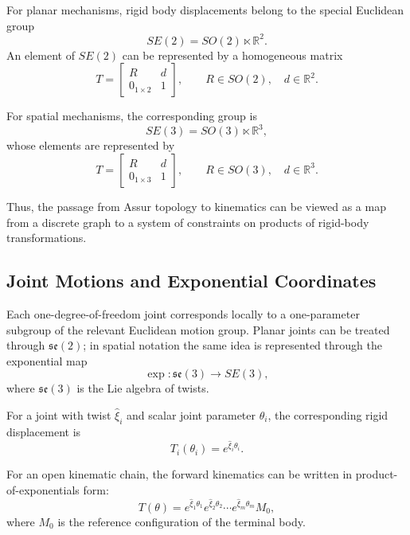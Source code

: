 For planar mechanisms, rigid body displacements belong to the special Euclidean group
\[
SE(2) = SO(2) \ltimes \mathbb{R}^2.
\]
An element of $SE(2)$ can be represented by a homogeneous matrix
\begin{equation}
T =
\begin{bmatrix}
R & d \\
0_{1\times 2} & 1
\end{bmatrix},
\qquad
R \in SO(2), \quad d \in \mathbb{R}^2.
\end{equation}

For spatial mechanisms, the corresponding group is
\[
SE(3) = SO(3) \ltimes \mathbb{R}^3,
\]
whose elements are represented by
\begin{equation}
T =
\begin{bmatrix}
R & d \\
0_{1\times 3} & 1
\end{bmatrix},
\qquad
R \in SO(3), \quad d \in \mathbb{R}^3.
\end{equation}

Thus, the passage from Assur topology to kinematics can be viewed as a map from a discrete graph to a system of constraints on products of rigid-body transformations.

\subsection{Joint Motions and Exponential Coordinates}

Each one-degree-of-freedom joint corresponds locally to a one-parameter subgroup of the relevant Euclidean motion group. Planar joints can be treated through $\mathfrak{se}(2)$; in spatial notation the same idea is represented through the exponential map
\[
\exp : \mathfrak{se}(3) \to SE(3),
\]
where $\mathfrak{se}(3)$ is the Lie algebra of twists.

For a joint with twist $\hat{\xi}_i$ and scalar joint parameter $\theta_i$, the corresponding rigid displacement is
\begin{equation}
T_i(\theta_i) = e^{\hat{\xi}_i \theta_i}.
\end{equation}

For an open kinematic chain, the forward kinematics can be written in product-of-exponentials form:
\begin{equation}
T(\theta)
=
e^{\hat{\xi}_1 \theta_1}
e^{\hat{\xi}_2 \theta_2}
\cdots
e^{\hat{\xi}_m \theta_m}
M_0,
\end{equation}
where $M_0$ is the reference configuration of the terminal body.

